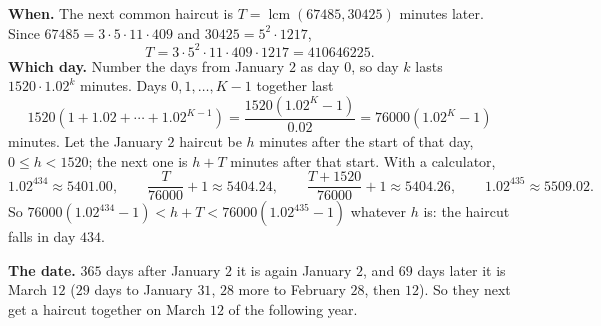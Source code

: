 \textbf{When.} The next common haircut is $T=\operatorname{lcm}(67485,30425)$ minutes later. Since $67485=3\cdot5\cdot11\cdot409$ and $30425=5^2\cdot1217$,
\[
T=3\cdot5^2\cdot11\cdot409\cdot1217=410646225 .
\]
\textbf{Which day.} Number the days from January $2$ as day $0$, so day $k$ lasts $1520\cdot1.02^k$ minutes. Days $0,1,\dots,K-1$ together last
\[
1520\left(1+1.02+\cdots+1.02^{K-1}\right)=\dfrac{1520\left(1.02^K-1\right)}{0.02}=76000\left(1.02^K-1\right)
\]
minutes. Let the January $2$ haircut be $h$ minutes after the start of that day, $0\le h<1520$; the next one is $h+T$ minutes after that start. With a calculator,
\[
1.02^{434}\approx5401.00,\qquad \dfrac{T}{76000}+1\approx5404.24,\qquad \dfrac{T+1520}{76000}+1\approx5404.26,\qquad 1.02^{435}\approx5509.02 .
\]
So $76000\left(1.02^{434}-1\right)<h+T<76000\left(1.02^{435}-1\right)$ whatever $h$ is: the haircut falls in day $434$.

\textbf{The date.} $365$ days after January $2$ it is again January $2$, and $69$ days later it is March $12$ ($29$ days to January $31$, $28$ more to February $28$, then $12$). So they next get a haircut together on $\boxed{\text{March }12}$ of the following year.
